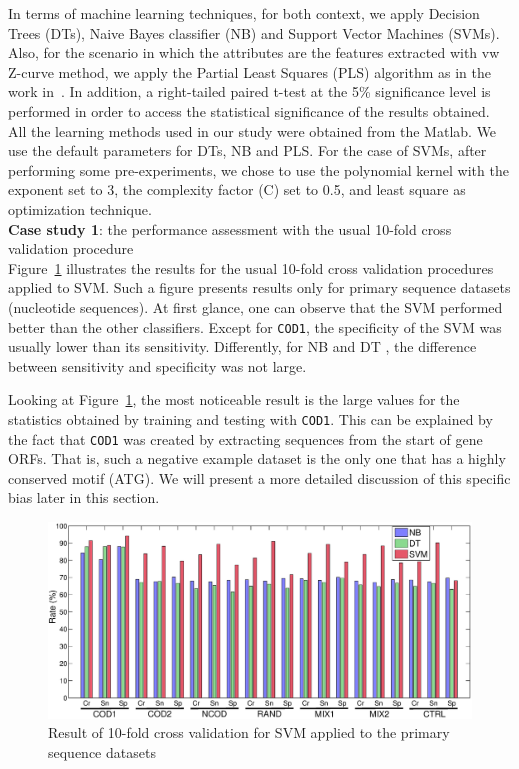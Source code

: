 \documentclass{sig-alternate}
\theoremstyle{plain}
\begin{document}
 In terms of machine learning techniques, for both context, we apply  Decision Trees (DTs),  Naive Bayes classifier (NB) and  Support Vector Machines (SVMs).  Also, for the scenario in which the attributes are the features extracted with  vw Z-curve  method, we apply the Partial Least Squares (PLS) algorithm as in the work in~\cite{song2011a}. In addition, a right-tailed paired t-test at the 5\% significance level is performed in order to access the statistical significance of the results obtained. All the learning methods used in our study were obtained from the Matlab. We use the default parameters for DTs, NB and PLS. For the case of SVMs, after performing some  pre-experiments, we chose to use the polynomial kernel with the exponent set to 3, the complexity factor (C) set to 0.5, and least square as optimization technique. \\

\noindent
{\bf Case study 1}: the performance assessment with the usual 10-fold cross validation procedure \\

Figure~\ref{fig:seq} illustrates the results for the  usual  10-fold cross validation procedures applied to  SVM. Such a figure presents results  only for primary sequence datasets (nucleotide sequences). At first glance, one can observe that  the SVM  performed better than the other classifiers. Except for {\tt COD1}, the specificity of the SVM  was usually lower than its sensitivity. Differently, for  NB and DT , the difference between  sensitivity and specificity was not large. 

Looking at Figure~\ref{fig:seq},  the most noticeable result is the large values for the statistics obtained by training and testing with {\tt COD1}. This can be explained by the fact that {\tt COD1}  was created by extracting  sequences from  the start of gene ORFs. That is, such a negative example  dataset is the only one that has a highly conserved motif (ATG).  We will present a more detailed discussion of this specific bias later in this section. 

\begin{figure}

\vspace{0.0cm}
    \centering
    \includegraphics[width=1.0\textwidth]{Figs/Fig1.eps}
    \caption{Result of 10-fold cross validation for  SVM applied to the primary sequence datasets \label{fig:seq}}
   \vspace{0.0cm}
\end{figure}
\end{document}
